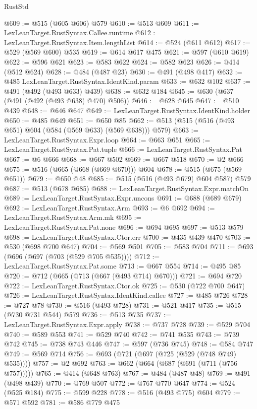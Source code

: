 \begin{lexlean}{RustStd}
\begin{coremodule}
{\begin{coremodule}
{{{{{{{{{{{{{@609 := @515 (@605 @606) @579
@610 := @513 @609
@611 := LexLeanTarget.RustSyntax.Callee.runtime
@612 := LexLeanTarget.RustSyntax.Item.lengthList
@614 := @524 (@611 @612)
@617 := @529 (@569 @600) @535
@619 := @614 @617 @475
@621 := @597 (@610 @619)
@622 := @596 @621
@623 := @583 @622
@624 := @582 @623
@626 := @414 (@512 @624)
@628 := @484 (@487 @23)
@630 := @491 (@498 @417)
@632 := @485 LexLeanTarget.RustSyntax.IdentKind.param
@633 := @632 @102
@637 := @491 (@492 (@493 @633) @439)
@638 := @632 @184
@645 := @630 (@637 (@491 (@492 (@493 @638) @470) @506))
@646 := @628 @645
@647 := @510 @439
@648 := @646 @647
@649 := LexLeanTarget.RustSyntax.IdentKind.holder
@650 := @485 @649
@651 := @650 @85
@662 := @513 (@515 (@516 (@493 @651) @604 (@584 (@569 @633) (@569 @638))) @579)
@663 := LexLeanTarget.RustSyntax.Expr.loop
@664 := @663 @651
@665 := LexLeanTarget.RustSyntax.Pat.tuple
@666 := LexLeanTarget.RustSyntax.Pat
@667 := @6 @666
@668 := @667 @502
@669 := @667 @518
@670 := @2 @666
@675 := @516 (@665 (@668 (@669 @670))) @604
@678 := @515 (@675 (@569 @651))
@679 := @650 @48
@685 := @515 (@516 (@493 @679) @604 @587) @579
@687 := @513 (@678 @685)
@688 := LexLeanTarget.RustSyntax.Expr.matchOn
@689 := LexLeanTarget.RustSyntax.Expr.uncons
@691 := @688 (@689 @679)
@692 := LexLeanTarget.RustSyntax.Arm
@693 := @6 @692
@694 := LexLeanTarget.RustSyntax.Arm.mk
@695 := LexLeanTarget.RustSyntax.Pat.none
@696 := @694 @695
@697 := @513 @579
@698 := LexLeanTarget.RustSyntax.Ctor.err
@700 := @435 @439 @470
@703 := @530 (@698 @700 @647)
@704 := @569 @501
@705 := @583 @704
@711 := @693 (@696 (@697 (@703 (@529 @705 @535))))
@712 := LexLeanTarget.RustSyntax.Pat.some
@713 := @667 @554
@714 := @495 @85
@720 := @712 (@665 (@713 (@667 (@493 @714) @670)))
@721 := @694 @720
@722 := LexLeanTarget.RustSyntax.Ctor.ok
@725 := @530 (@722 @700 @647)
@726 := LexLeanTarget.RustSyntax.IdentKind.callee
@727 := @485 @726
@728 := @727 @78
@730 := @516 (@493 @728)
@731 := @521 @417
@735 := @515 (@730 @731 @544) @579
@736 := @513 @735
@737 := LexLeanTarget.RustSyntax.Expr.apply
@738 := @737 @728
@739 := @529 @704
@740 := @589 @553
@741 := @529 @740
@742 := @741 @535
@743 := @739 @742
@745 := @738 @743 @446
@747 := @597 (@736 @745)
@748 := @584 @747
@749 := @569 @714
@756 := @693 (@721 (@697 (@725 (@529 (@748 @749) @535))))
@757 := @2 @692
@763 := @662 (@664 (@687 (@691 (@711 (@756 @757)))))
@765 := @414 (@648 @763)
@767 := @484 (@487 @48)
@769 := @491 (@498 @439)
@770 := @769 @507
@772 := @767 @770 @647
@774 := @524 (@525 @184)
@775 := @599 @228
@778 := @516 (@493 @775) @604
@779 := @571 @592
@781 := @586 @779 @475
}}}}}}}}}}}}}
\end{coremodule}}
\end{coremodule}
\end{lexlean}
